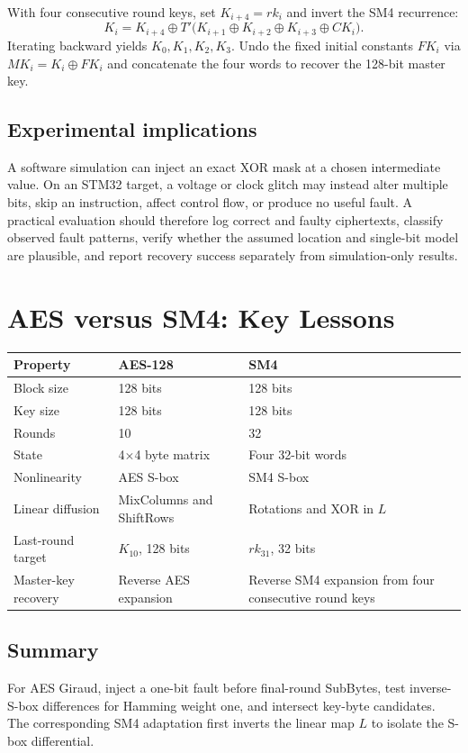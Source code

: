 \documentclass[11pt,a4paper]{report}
\newcommand{\xor}{\mathbin{\oplus}}
\begin{document}
With four consecutive round keys, set $K_{i+4}=rk_i$ and invert the SM4 recurrence:
\begin{equation}
K_i=K_{i+4}\xor T'\bigl(K_{i+1}\xor K_{i+2}\xor K_{i+3}\xor CK_i\bigr).
\end{equation}
Iterating backward yields $K_0,K_1,K_2,K_3$. Undo the fixed initial constants $FK_i$ via $MK_i=K_i\xor FK_i$ and concatenate the four words to recover the 128-bit master key.

\section{Experimental implications}
A software simulation can inject an exact XOR mask at a chosen intermediate value. On an STM32 target, a voltage or clock glitch may instead alter multiple bits, skip an instruction, affect control flow, or produce no useful fault. A practical evaluation should therefore log correct and faulty ciphertexts, classify observed fault patterns, verify whether the assumed location and single-bit model are plausible, and report recovery success separately from simulation-only results.

\chapter{AES versus SM4: Key Lessons}
\begin{center}\begin{tabular}{p{.35\linewidth}p{.28\linewidth}p{.28\linewidth}}\toprule Property&AES-128&SM4\\\midrule Block size&128 bits&128 bits\\Key size&128 bits&128 bits\\Rounds&10&32\\State&4$\times$4 byte matrix&Four 32-bit words\\Nonlinearity&AES S-box&SM4 S-box\\Linear diffusion&MixColumns and ShiftRows&Rotations and XOR in \(L\)\\Last-round target&\(K_{10}\), 128 bits&\(rk_{31}\), 32 bits\\Master-key recovery&Reverse AES expansion&Reverse SM4 expansion from four consecutive round keys\\\bottomrule\end{tabular}\end{center}
\section*{Summary}
For AES Giraud, inject a one-bit fault before final-round SubBytes, test inverse-S-box differences for Hamming weight one, and intersect key-byte candidates. The corresponding SM4 adaptation first inverts the linear map $L$ to isolate the S-box differential.
\end{document}
